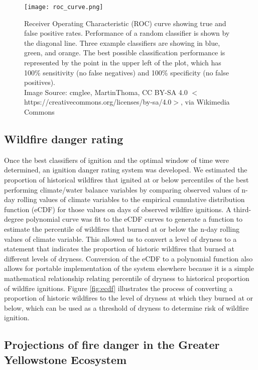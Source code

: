 \documentclass[11p]{article}
\begin{document}
\begin{table}
{\begin{figure}[htbp]
  \centering
  \texttt{[image: roc\_curve.png]}
  \caption{Receiver Operating Characteristic (ROC) curve showing true and false positive rates. Performance of a random classifier is shown by the diagonal line. Three example classifiers are showing in blue, green, and orange. The best possible classification performance is represented by the point in the upper left of the plot, which has 100\% sensitivity (no false negatives) and 100\% specificity (no false positives). \\ Image Source: cmglee, MartinThoma, CC BY-SA 4.0 $<$https://creativecommons.org/licenses/by-sa/4.0$>$, via Wikimedia Commons}
    \label{fig:roc}
\end{figure}

\subsection{Wildfire danger rating}

Once the best classifiers of ignition and the optimal window of time were determined, an ignition danger rating system was developed. We estimated the proportion of historical wildfires that ignited at or below percentiles of the best performing climate/water balance variables by comparing observed values of n-day rolling values of climate variables to the empirical cumulative distribution function (eCDF) for those values on days of observed wildfire ignitions. A third-degree polynomial curve was fit to the eCDF curves to generate a function to estimate the percentile of wildfires that burned at or below the n-day rolling values of climate variable. This allowed us to convert a level of dryness to a statement that indicates the proportion of historic wildfires that burned at different levels of dryness. Conversion of the eCDF to a polynomial function also allows for portable implementation of the system elsewhere because it is a simple mathematical relationship relating percentile of dryness to historical proportion of wildfire ignitions. Figure \ref{fig:ecdf} illustrates the process of converting a proportion of historic wildfires to the level of dryness at which they burned at or below, which can be used as a threshold of dryness to determine risk of wildfire ignition.

\subsection{Projections of fire danger in the Greater Yellowstone Ecosystem}

}
\end{table}
\end{document}
